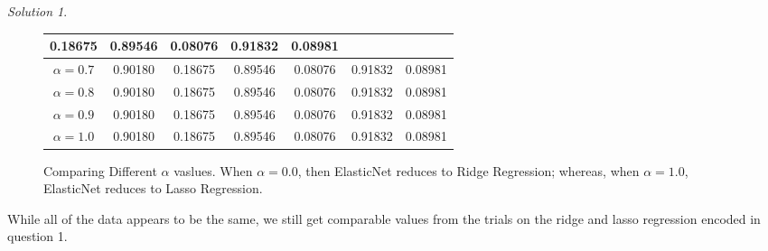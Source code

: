 \documentclass[a4paper,12pt]{article}
\theoremstyle{definition}
\theoremstyle{remark}
\newtheorem*{solution}{Solution}
\begin{document}
\begin{enumerate}
\begin{enumerate}
\begin{solution}
\begin{figure}
\begin{tabular}{|c|cc|cc|cc|}
				0.18675&
				0.89546&
				0.08076&
				0.91832&
				0.08981\\
				\hline
				$\alpha = 0.7$& 0.90180&
				0.18675&
				0.89546&
				0.08076&
				0.91832&
				0.08981\\
				\hline
				$\alpha = 0.8$& 0.90180&
				0.18675&
				0.89546&
				0.08076&
				0.91832&
				0.08981\\
				\hline
				$\alpha = 0.9$& 0.90180&
				0.18675&
				0.89546&
				0.08076&
				0.91832&
				0.08981\\
				\hline
				$\alpha = 1.0$&0.90180&
				0.18675&
				0.89546&
				0.08076&
				0.91832&
				0.08981\\
				\hline
				\end{tabular}
				\caption{Comparing Different $\alpha$  vaslues. When $\alpha = 0.0$, then ElasticNet reduces to Ridge Regression; whereas, when $\alpha = 1.0$, ElasticNet reduces to Lasso Regression.}
				\label{tab:alphaVals}
			\end{figure}
			While all of the data appears to be the same, we still get comparable values from the trials on the ridge and lasso regression encoded in question 1.
			

\end{solution}
\end{enumerate}
\end{enumerate}
\end{document}
